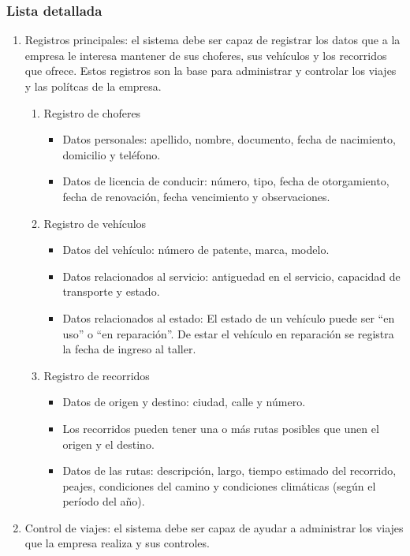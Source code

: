 \subsubsection{Lista detallada}
\begin{enumerate}
\item Registros principales: el sistema debe ser capaz de registrar los datos que a la empresa le interesa mantener de sus choferes,
  sus veh\'iculos y los recorridos que ofrece. Estos registros son la base para administrar y controlar los viajes y las pol\'itcas de la empresa.
  \begin{enumerate}[label=\Roman{*}]
  \item Registro de choferes
    \begin{itemize}
      \item Datos personales: apellido, nombre, documento, fecha de nacimiento, domicilio y tel\'efono.
      \item Datos de licencia de conducir: n\'umero, tipo, fecha de otorgamiento, fecha de renovaci\'on, fecha vencimiento y observaciones.
    \end{itemize}
  \item Registro de veh\'iculos
    \begin{itemize}
      \item Datos del veh\'iculo: n\'umero de patente, marca, modelo.
      \item Datos relacionados al servicio: antiguedad en el servicio, capacidad de transporte y estado.
      \item Datos relacionados al estado: El estado de un veh\'iculo puede ser ``en uso'' o ``en reparaci\'on''. 
      De estar el veh\'iculo en reparaci\'on se registra la fecha de ingreso al taller.
    \end{itemize}
  \item Registro de recorridos
    \begin{itemize}
      \item Datos de origen y destino: ciudad, calle y n\'umero.
      \item Los recorridos pueden tener una o m\'as rutas posibles que unen el origen y el destino.
      \item Datos de las rutas: descripci\'on, largo, tiempo estimado del recorrido, peajes, condiciones
      del camino y condiciones clim\'aticas (seg\'un el per\'iodo del a\~no).
    \end{itemize}  
  \end{enumerate}
\item Control de viajes: el sistema debe ser capaz de ayudar a administrar los viajes que la empresa realiza y sus controles.

\end{enumerate}
